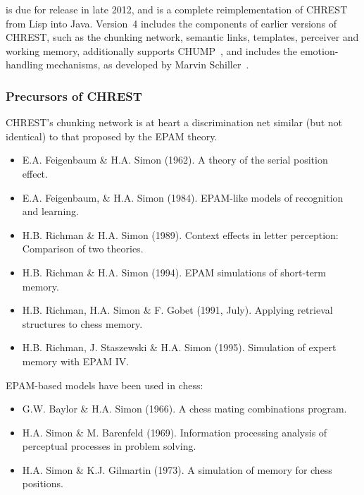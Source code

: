 \documentclass{article}
\begin{document}
 is due for release in late 2012, and is a
complete reimplementation of CHREST from Lisp into Java.  Version~4 includes
the components of earlier versions of CHREST, such as the chunking network,
semantic links, templates, perceiver and working memory, additionally supports
CHUMP~\cite{Bossomaier12,Gobet94}, and includes the emotion-handling
mechanisms, as developed by Marvin Schiller~\cite{Gobet11a}.

\subsubsection{Precursors of CHREST}

CHREST's chunking network is at heart a discrimination net similar (but not
identical) to that proposed by the EPAM theory.

\begin{itemize}
\item E.A. Feigenbaum \& H.A. Simon (1962). A theory of the serial position
effect.~\cite{Feigenbaum62}
\item E.A. Feigenbaum, \& H.A. Simon (1984). EPAM-like models of recognition 
and learning.~\cite{Feigenbaum84}
\item H.B. Richman \& H.A. Simon (1989). Context effects in letter
perception: Comparison of two theories.~\cite{Richman89}
\item H.B. Richman \& H.A. Simon (1994). EPAM simulations of short-term
memory.~\cite{Richman94} 
\item H.B. Richman, H.A. Simon \& F. Gobet (1991, July).
Applying retrieval structures to chess memory.~\cite{Richman91}
\item H.B. Richman, J. Staszewski \& H.A. Simon (1995). Simulation of expert memory with EPAM IV.~\cite{Richman95}
\end{itemize}

\noindent EPAM-based models have been used in chess:

\begin{itemize}
\item G.W. Baylor \& H.A. Simon (1966). A chess mating combinations program.~\cite{Baylor66}
\item H.A. Simon \& M. Barenfeld (1969). Information processing analysis of perceptual processes in problem solving.\cite{Simon69b}
\item H.A. Simon \& K.J. Gilmartin (1973). A simulation of memory for 
chess positions.~\cite{Simon73}
\end{itemize}






\end{document}
